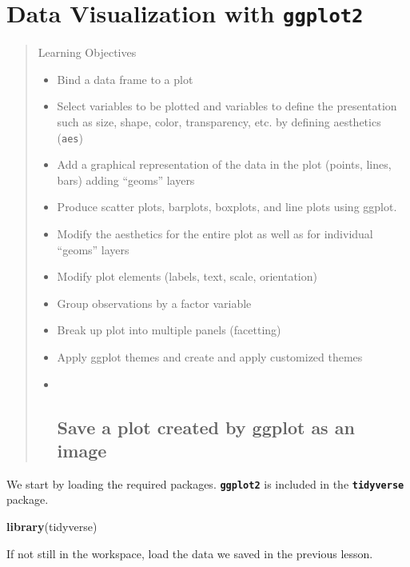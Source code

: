 \documentclass[]{book}
\newenvironment{Shaded}{\begin{snugshade}}{\end{snugshade}}
\newcommand{\KeywordTok}[1]{\textcolor[rgb]{0.13,0.29,0.53}{\textbf{#1}}}
\newcommand{\NormalTok}[1]{#1}
\theoremstyle{definition}
\theoremstyle{definition}
\theoremstyle{definition}
\theoremstyle{remark}
\begin{document}
\chapter{\texorpdfstring{Data Visualization with
\texttt{ggplot2}}{Data Visualization with ggplot2}}\label{data-visualization-with-ggplot2}

\begin{quote}
Learning Objectives

\begin{itemize}
\item
  Bind a data frame to a plot
\item
  Select variables to be plotted and variables to define the
  presentation such as size, shape, color, transparency, etc. by
  defining aesthetics (\texttt{aes})
\item
  Add a graphical representation of the data in the plot (points, lines,
  bars) adding ``geoms'' layers
\item
  Produce scatter plots, barplots, boxplots, and line plots using
  ggplot.
\item
  Modify the aesthetics for the entire plot as well as for individual
  ``geoms'' layers
\item
  Modify plot elements (labels, text, scale, orientation)
\item
  Group observations by a factor variable
\item
  Break up plot into multiple panels (facetting)
\item
  Apply ggplot themes and create and apply customized themes
\item ~
  \section{Save a plot created by ggplot as an
  image}\label{save-a-plot-created-by-ggplot-as-an-image}
\end{itemize}
\end{quote}

We start by loading the required packages. \textbf{\texttt{ggplot2}} is
included in the \textbf{\texttt{tidyverse}} package.

\begin{Shaded}
\begin{Highlighting}[]
\KeywordTok{library}\NormalTok{(tidyverse)}
\end{Highlighting}
\end{Shaded}

If not still in the workspace, load the data we saved in the previous
lesson.
\end{document}
